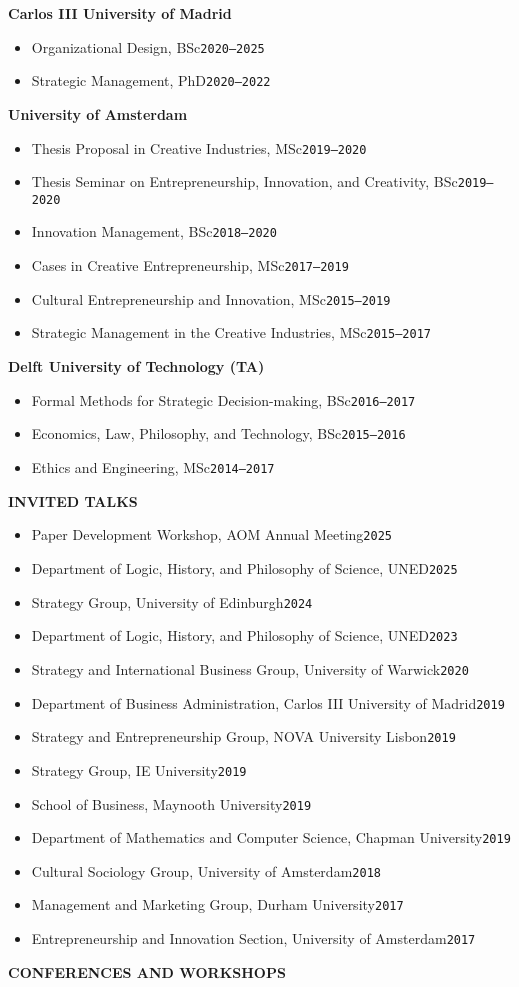 \documentclass[a4paper]{article}
\newenvironment{cvlines}{\begin{itemize}[nosep,leftmargin=1em]}{\end{itemize}}
\newcommand\cvsection[1]{\textbf{\uppercase{#1}}\hspace{.5em}\hrulefill\par}
\newcommand\cvsubsection[1]{\textbf{#1}\par}
\newcommand\cvline[4][,]{\item[\textperiodcentered] {#2#1 #3\hfill{\texttt{#4}}}}
\begin{document}
\medskip
\cvsubsection{Carlos III University of Madrid}
\smallskip
\begin{cvlines}
  \cvline{Organizational Design}{BSc}{2020--2025}
  \cvline{Strategic Management}{PhD}{2020--2022}
\end{cvlines}
\medskip
\cvsubsection{University of Amsterdam}
\smallskip
\begin{cvlines}
  \cvline{Thesis Proposal in Creative Industries}{MSc}{2019--2020}
  \cvline{Thesis Seminar on Entrepreneurship, Innovation, and Creativity}{BSc}{2019--2020}
  \cvline{Innovation Management}{BSc}{2018--2020}
  \cvline{Cases in Creative Entrepreneurship}{MSc}{2017--2019}
  \cvline{Cultural Entrepreneurship and Innovation}{MSc}{2015--2019}
  \cvline{Strategic Management in the Creative Industries}{MSc}{2015--2017}
\end{cvlines}
\medskip
\cvsubsection{Delft University of Technology (TA)}
\smallskip
\begin{cvlines}
  \cvline{Formal Methods for Strategic Decision-making}{BSc}{2016--2017}
  \cvline{Economics, Law, Philosophy, and Technology}{BSc}{2015--2016}
  \cvline{Ethics and Engineering}{MSc}{2014--2017}
\end{cvlines}
\bigskip
\cvsection{Invited talks}
\smallskip
\begin{cvlines}
  \cvline{Paper Development Workshop}{AOM Annual Meeting}{2025}
  \cvline{Department of Logic, History, and Philosophy of Science}{UNED}{2025}
  \cvline{Strategy Group}{University of Edinburgh}{2024}
  \cvline{Department of Logic, History, and Philosophy of Science}{UNED}{2023}
  \cvline{Strategy and International Business Group}{University of Warwick}{2020}
  \cvline{Department of Business Administration}{Carlos III University of Madrid}{2019}
  \cvline{Strategy and Entrepreneurship Group}{NOVA University Lisbon}{2019}
  \cvline{Strategy Group}{IE University}{2019}
  \cvline{School of Business}{Maynooth University}{2019}
  \cvline{Department of Mathematics and Computer Science}{Chapman University}{2019}
  \cvline{Cultural Sociology Group}{University of Amsterdam}{2018}
  \cvline{Management and Marketing Group}{Durham University}{2017}
  \cvline{Entrepreneurship and Innovation Section}{University of Amsterdam}{2017}
\end{cvlines}
\bigskip
\cvsection{Conferences and workshops}
\smallskip
\end{document}
